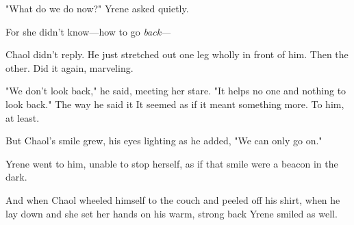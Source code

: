 "What do we do now?" Yrene asked quietly.

For she didn't know---how to go \emph{back}---

Chaol didn't reply. He just stretched out one leg wholly in front of him. Then the other. Did it again, marveling.

"We don't look back," he said, meeting her stare. "It helps no one and nothing to look back." The way he said it  It seemed as if it meant something more. To him, at least.

But Chaol's smile grew, his eyes lighting as he added, "We can only go on."

Yrene went to him, unable to stop herself, as if that smile were a beacon in the dark.

And when Chaol wheeled himself to the couch and peeled off his shirt, when he lay down and she set her hands on his warm, strong back 
Yrene smiled as well.

